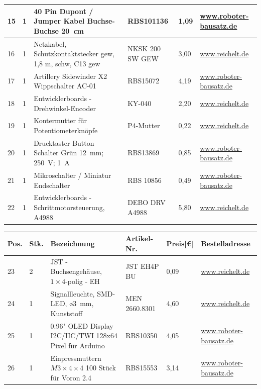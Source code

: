 \begin{center}
\begin{tabularx}{\textwidth}{|p{0.4cm}|p{0.4cm}|X|X|p{1cm}|X|}
		\hline
		15 & 1 & 40 Pin Dupont / Jumper Kabel Buchse-Buchse 20\ cm & RBS101136 & 1,09 & \href{https://www.roboter-bausatz.de/p/40-pin-dupont-jumper-kabel-buchse-buchse-20-cm}{www.roboter-bausatz.de} \\
		\hline
		16 & 1 & Netzkabel, Schutzkontaktstecker gew, 1,8 m, schw, C13 gew & NKSK 200 SW GEW & 3,00 & \href{www.reichelt.de}{www.reichelt.de} \\
		\hline
		17 & 1 & Artillery Sidewinder X2 Wippschalter AC-01 & RBS15072 & 4,19 & \href{https://www.roboter-bausatz.de/p/artillery-sidewinder-x2-wippschalter-ac-01}{www.roboter-bausatz.de} \\
		\hline
		18 & 1 & Entwicklerboards - Drehwinkel-Encoder & KY-040 & 2,20 & \href{www.reichelt.de}{www.reichelt.de} \\
		\hline
		19 & 1 & Kontermutter für Potentiometerknöpfe & P4-Mutter & 0,22 & \href{www.reichelt.de}{www.reichelt.de} \\
		\hline
		20 & 1 & Drucktaster Button Schalter Grün 12\ mm; 250\ V; 1\ A  & RBS13869 & 0,85 & \href{https://www.roboter-bausatz.de/p/drucktaster-button-schalter-gruen-12mm-250v-1a}{www.roboter-bausatz.de} \\
		\hline
		21 & 1 & Mikroschalter / Miniatur Endschalter & RBS 10856 & 0,49 & \href{https://www.roboter-bausatz.de/p/mikroschalter-miniatur-endschalter}{www.roboter-bausatz.de} \\
		\hline
		22 & 1 & Entwicklerboards - Schrittmotorsteuerung, A4988 & DEBO DRV A4988 & 5,80 & \href{https://wwww.reichelt.de}{www.reichelt.de} \\
		\hline
	\end{tabularx}
	\newpage
	\fontsize{8}{10}\selectfont
	\begin{tabularx}{\textwidth}{|p{0.4cm}|p{0.4cm}|X|X|p{1cm}|X|}
		\hline 
		\textbf{Pos.} & \textbf{Stk.} & \textbf{Bezeichnung} & \textbf{Artikel-Nr.} & \textbf{Preis[€]} & \textbf{Bestelladresse} \\ \hline
		23 & 2 & JST - Buchsengehäuse, $1 \times 4$-polig - EH & JST EH4P BU & 0,09 & \href{https://wwww.reichelt.de}{www.reichelt.de} \\
		\hline
		24 & 1 & Signallleuchte, SMD-LED, ø3\ mm, Kunststoff & MEN 2660.8301 & 4,60 & \href{https://wwww.reichelt.de}{www.reichelt.de} \\
		\hline
		25 & 1 & 0.96" OLED Display I2C/IIC/TWI 128x64 Pixel für Arduino & RBS10350 & 4,05 & \href{https://www.roboter-bausatz.de/p/0.96-oled-display-i2c-iic-twi-128x64-pixel-fuer-arduino}{www.roboter-bausatz.de} \\
		\hline
		26 & 1 & Einpressmuttern $M3\times 4 \times 4$ 100 Stück für Voron 2.4 & RBS15553 & 3,14 & \href{https://www.roboter-bausatz.de/p/einpressmuttern-m3x4x4-100-stueck-fuer-voron-2.4}{www.roboter-bausatz.de} \\
		\hline
	\end{tabularx}
	
\end{center}

